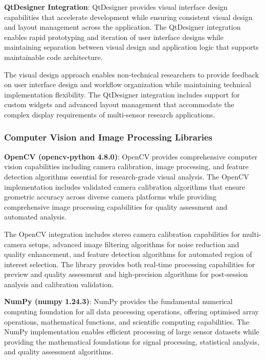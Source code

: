 \documentclass[11pt,a4paper]{report}
\begin{document}
\noindent \textbf{QtDesigner Integration}: QtDesigner provides visual interface design capabilities that accelerate development while ensuring consistent visual design and layout management across the application. The QtDesigner integration enables rapid prototyping and iteration of user interface designs while maintaining separation between visual design and application logic that supports maintainable code architecture.

The visual design approach enables non-technical researchers to provide feedback on user interface design and workflow organization while maintaining technical implementation flexibility. The QtDesigner integration includes support for custom widgets and advanced layout management that accommodate the complex display requirements of multi-sensor research applications.

\subsubsection{Computer Vision and Image Processing Libraries}

\noindent \textbf{OpenCV (opencv-python 4.8.0)}: OpenCV provides comprehensive computer vision capabilities including camera calibration, image processing, and feature detection algorithms essential for research-grade visual analysis. The OpenCV implementation includes validated camera calibration algorithms that ensure geometric accuracy across diverse camera platforms while providing comprehensive image processing capabilities for quality assessment and automated analysis.

The OpenCV integration includes stereo camera calibration capabilities for multi-camera setups, advanced image filtering algorithms for noise reduction and quality enhancement, and feature detection algorithms for automated region of interest selection. The library provides both real-time processing capabilities for preview and quality assessment and high-precision algorithms for post-session analysis and calibration validation.

\noindent \textbf{NumPy (numpy 1.24.3)}: NumPy provides the fundamental numerical computing foundation for all data processing operations, offering optimised array operations, mathematical functions, and scientific computing capabilities. The NumPy implementation enables efficient processing of large sensor datasets while providing the mathematical foundations for signal processing, statistical analysis, and quality assessment algorithms.
\end{document}
